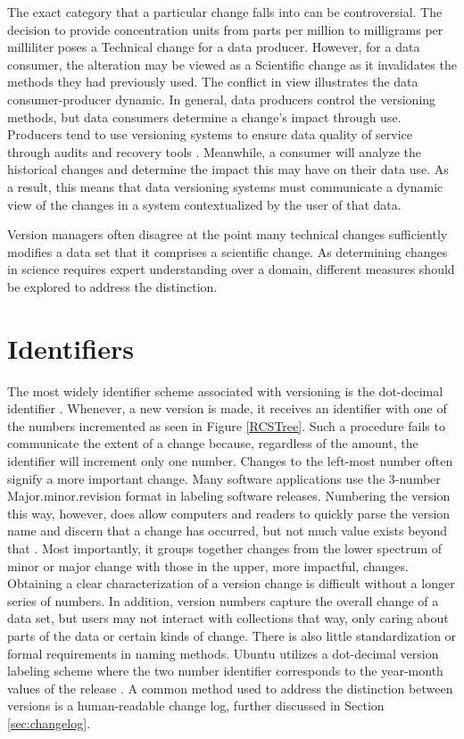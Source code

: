 The exact category that a particular change falls into can be controversial.
The decision to provide concentration units from parts per million to milligrams per milliliter poses a Technical change for a data producer.
However, for a data consumer, the alteration may be viewed as a Scientific change as it invalidates the methods they had previously used.
The conflict in view illustrates the data consumer-producer dynamic.
In general, data producers control the versioning methods, but data consumers determine a change's impact through use.
Producers tend to use versioning systems to ensure data quality of service through audits and recovery tools \cite{Cavanaugh2002}.
Meanwhile, a consumer will analyze the historical changes and determine the impact this may have on their data use.
As a result, this means that data versioning systems must communicate a dynamic view of the changes in a system contextualized by the user of that data.

Version managers often disagree at the point many technical changes sufficiently modifies a data set that it comprises a scientific change.
As determining changes in science requires expert understanding over a domain, different measures should be explored to address the distinction.

\section{Identifiers}\label{sec:identifier}

The most widely identifier scheme associated with versioning is the dot-decimal identifier \cite{Stuckenholz:2005:CEV:1039174.1039197}.
Whenever, a new version is made, it receives an identifier with one of the numbers incremented as seen in Figure \ref{RCSTree}.
Such a procedure fails to communicate the extent of a change because, regardless of the amount, the identifier will increment only one number.
Changes to the left-most number often signify a more important change.
Many software applications use the 3-number Major.minor.revision format in labeling software releases.
Numbering the version this way, however, does allow computers and readers to quickly parse the version name and discern that a change has occurred, but not much value exists beyond that \cite{Dijkstra1994}.
Most importantly, it groups together changes from the lower spectrum of minor or major change with those in the upper, more impactful, changes.
Obtaining a clear characterization of a version change is difficult without a longer series of numbers.
In addition, version numbers capture the overall change of a data set, but users may not interact with collections that way, only caring about parts of the data or certain kinds of change.
There is also little standardization or formal requirements in naming methods.
Ubuntu utilizes a dot-decimal version labeling scheme where the two number identifier corresponds to the year-month values of the release \cite{Ubuntu}.
A common method used to address the distinction between versions is a human-readable change log, further discussed in Section \ref{sec:changelog}.

